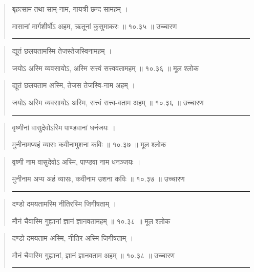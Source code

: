 \begin{quotation}

बृहत्साम तथा साम्-नाम, गायत्री छन्द सामहम्‌  ।  

मासानां मार्गशीर्षोऽ अहम, ऋतूनां कुसुमाकरः ॥ १०.३५ ॥  उच्चारण

\noindent\rule{16cm}{0.4pt} 
\end{quotation}


\begin{quotation} 

द्यूतं छलयतामस्मि तेजस्तेजस्विनामहम् ।  

जयोऽ अस्मि व्यवसायोऽ, अस्मि सत्त्वं सत्त्ववतामहम्  ॥ १०.३६ ॥  मूल श्लोक
\end{quotation}

\begin{quotation}

द्यूतं छलयताम अस्मि, तेजस तेजस्वि-नाम अहम्‌  ।  

जयोऽ अस्मि व्यवसायोऽ अस्मि, सत्त्वं सत्त्व-वताम अहम्‌  ॥ १०.३६ ॥  उच्चारण

\noindent\rule{16cm}{0.4pt} 
\end{quotation}


\begin{quotation} 

वृष्णीनां वासुदेवोऽस्मि पाण्डवानां धनंजयः ।  

मुनीनामप्यहं व्यासः कवीनामुशना कविः  ॥ १०.३७ ॥  मूल श्लोक
\end{quotation}

\begin{quotation}

वृष्णी नाम वासुदेवोऽ अस्मि, पाण्डवा नाम धनञ्जयः  ।  

मुनीनाम अप्य अहं व्यासः, कवीनाम उशना कविः  ॥ १०.३७ ॥  उच्चारण

\noindent\rule{16cm}{0.4pt} 
\end{quotation}


\begin{quotation} 

दण्डो दमयतामस्मि नीतिरस्मि जिगीषताम् ।  

मौनं चैवास्मि गुह्यानां ज्ञानं ज्ञानवतामहम्  ॥ १०.३८ ॥  मूल श्लोक
\end{quotation}

\begin{quotation}

दण्डो दमयताम अस्मि, नीतिर अस्मि जिगीषताम्‌  ।  

मौनं चैवास्मि गुह्यानां, ज्ञानं ज्ञानवताम अहम्‌  ॥ १०.३८ ॥  उच्चारण

\noindent\rule{16cm}{0.4pt} 
\end{quotation}


